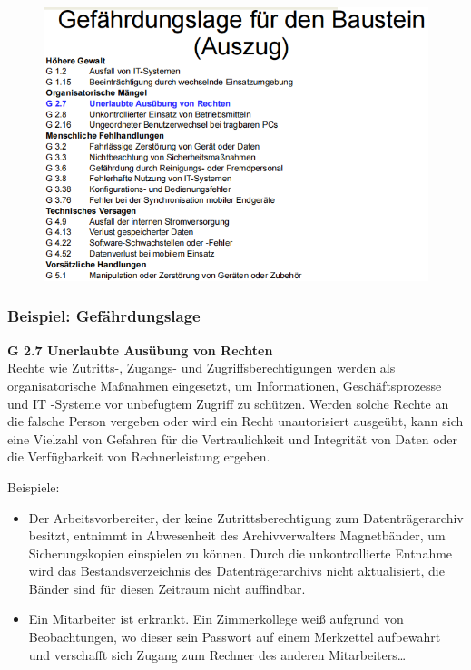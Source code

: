 \documentclass[openany]{book}
\begin{document}
\begin{figure}[h!]
    \centering
    \includegraphics[width=\linewidth]{Pics/BausteinGefaehrdungslage.PNG}
\end{figure}

\subsubsection{Beispiel: Gefährdungslage}

\textbf{G 2.7 Unerlaubte Ausübung von Rechten} \\ Rechte wie Zutritts-, Zugangs- und Zugriffsberechtigungen werden als organisatorische 
Maßnahmen eingesetzt, um Informationen, Geschäftsprozesse und IT -Systeme vor unbefugtem 
Zugriff zu schützen. Werden solche Rechte an die falsche Person vergeben oder wird ein Recht 
unautorisiert ausgeübt, kann sich eine Vielzahl von Gefahren für die Vertraulichkeit und Integrität 
von Daten oder die Verfügbarkeit von Rechnerleistung ergeben. 

Beispiele:
\begin{itemize}
    \item Der Arbeitsvorbereiter, der keine Zutrittsberechtigung zum Datenträgerarchiv besitzt, entnimmt in 
    Abwesenheit des Archivverwalters Magnetbänder, um Sicherungskopien einspielen zu können. 
    Durch die unkontrollierte Entnahme wird das Bestandsverzeichnis des Datenträgerarchivs nicht 
    aktualisiert, die Bänder sind für diesen Zeitraum nicht auffindbar.
    \item Ein Mitarbeiter ist erkrankt. Ein Zimmerkollege weiß aufgrund von Beobachtungen, wo dieser sein 
    Passwort auf einem Merkzettel aufbewahrt und verschafft sich Zugang zum Rechner des anderen 
    Mitarbeiters\dots
\end{itemize}
\end{document}
